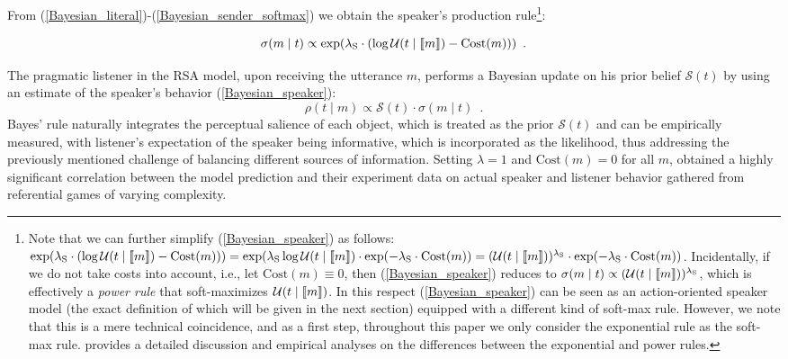 From (\ref{Bayesian_literal})-(\ref{Bayesian_sender_softmax}) we obtain the speaker's production rule\footnote{Note that we can further simplify (\ref{Bayesian_speaker}) as follows: $\exp(\lambda_\mathrm{S} \cdot (\log \mathcal{U}(t\mid \llbracket m \rrbracket)-\mbox{Cost}(m)))
=\exp(\lambda_\mathrm{S} \log \mathcal{U}(t\mid \llbracket m \rrbracket) \cdot \exp(-\lambda_\mathrm{S}\cdot \mbox{Cost}(m))
=(\mathcal{U}(t\mid \llbracket m \rrbracket))^{\lambda_\mathrm{S}}\cdot \exp(-\lambda_\mathrm{S}\cdot \mbox{Cost}(m))$. Incidentally, if we do not take costs into account, i.e., let $\mbox{Cost}(m)\equiv 0$, then (\ref{Bayesian_speaker}) reduces to $\sigma(m \mid t) \propto (\mathcal{U}(t\mid \llbracket m \rrbracket))^{\lambda_\mathrm{S}}$, which is effectively a \emph{power rule} that soft-maximizes $\mathcal{U}(t\mid \llbracket m \rrbracket)$. In this respect 
(\ref{Bayesian_speaker}) can be seen as an action-oriented speaker model (the exact definition of which will be given in the next section) equipped with 
a different kind of soft-max rule. However, we note that this is a mere technical coincidence, and as a first step, throughout this paper we only consider the exponential 
rule as the soft-max rule. \cite{Worthy2008ratio} provides a detailed discussion and empirical analyses on the differences between the exponential and power rules.}:

\begin{equation} \label{Bayesian_speaker}
\sigma(m \mid t) \propto \exp(\lambda_\mathrm{S} \cdot (\log \mathcal{U}(t\mid \llbracket m \rrbracket)-\mbox{Cost}(m))) \enspace .
\end{equation}

The pragmatic listener in the RSA model, upon receiving the utterance
$m$, performs a Bayesian update on his prior belief $\mathcal{S}(t)$
by using an estimate of the speaker's behavior
(\ref{Bayesian_speaker}):
\begin{equation} \label{Bayesian_rec_update}
\rho(t \mid m) \propto \mathcal{S}(t)\cdot \sigma(m \mid t) \enspace .  
\end{equation}
Bayes' rule naturally integrates the perceptual salience of each
object, which is treated as the prior $\mathcal{S}(t)$ and can be
empirically measured, with listener's expectation of the speaker being
informative, which is incorporated as the likelihood, thus addressing
the previously mentioned challenge of balancing different sources of
information. Setting $\lambda=1$ and $\mbox{Cost}(m)=0$ for all $m$,
\cite{Frank} obtained a highly significant correlation between the
model prediction and their experiment data on actual speaker and
listener behavior gathered from referential games of varying
complexity.


